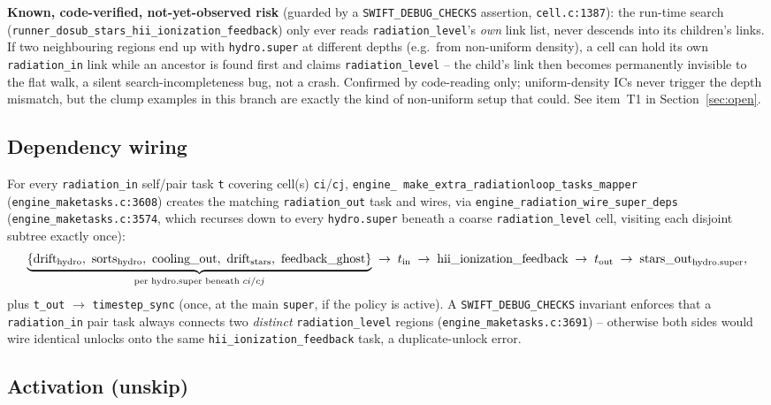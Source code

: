 \textbf{Known, code-verified, not-yet-observed risk} (guarded by a
\texttt{SWIFT\_DEBUG\_CHECKS} assertion, \texttt{cell.c:1387}): the
run-time search
(\texttt{runner\_dosub\_stars\_hii\_ionization\_feedback}) only ever
reads \texttt{radiation\_level}'s \emph{own} link list, never descends
into its children's links. If two neighbouring regions end up with
\texttt{hydro.super} at different depths (e.g.\ from non-uniform
density), a cell can hold its own \texttt{radiation\_in} link while an
ancestor is found first and claims \texttt{radiation\_level} -- the
child's link then becomes permanently invisible to the flat walk, a
silent search-incompleteness bug, not a crash. Confirmed by
code-reading only; uniform-density ICs never trigger the depth
mismatch, but the clump examples in this branch are exactly the kind
of non-uniform setup that could. See item~T1 in
Section~\ref{sec:open}.

\subsection{Dependency wiring}

For every \texttt{radiation\_in} self/pair task \texttt{t} covering
cell(s) \texttt{ci}/\texttt{cj}, \texttt{engine\_\allowbreak
make\_extra\_radiationloop\_tasks\_mapper}
(\texttt{engine\_maketasks.c:3608}) creates the matching
\texttt{radiation\_out} task and wires, via
\texttt{engine\_radiation\_wire\_super\_deps}
(\texttt{engine\_maketasks.c:3574}, which recurses down to every
\texttt{hydro.super} beneath a coarse \texttt{radiation\_level} cell,
visiting each disjoint subtree exactly once):
\[
  \underbrace{\{\text{drift}_{\rm hydro},\ \text{sorts}_{\rm hydro},\ \text{cooling\_out},\ \text{drift}_{\rm stars},\ \text{feedback\_ghost}\}}_{\text{per hydro.super beneath } ci/cj}
  \;\to\; t_{\rm in} \;\to\; \text{hii\_ionization\_feedback} \;\to\; t_{\rm out} \;\to\; \text{stars\_out}_{\rm hydro.super},
\]
plus \texttt{t\_out} $\to$ \texttt{timestep\_sync} (once, at the main
\texttt{super}, if the policy is active). A
\texttt{SWIFT\_DEBUG\_CHECKS} invariant enforces that a
\texttt{radiation\_in} pair task always connects two \emph{distinct}
\texttt{radiation\_level} regions (\texttt{engine\_maketasks.c:3691}) --
otherwise both sides would wire identical unlocks onto the same
\texttt{hii\_ionization\_feedback} task, a duplicate-unlock error.

\subsection{Activation (unskip)}

